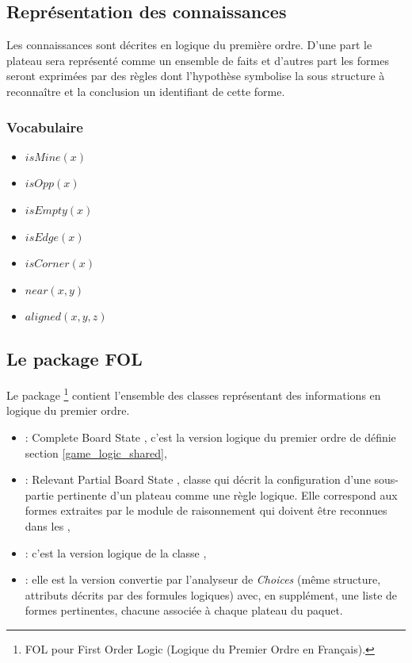 \subsection{Représentation des connaissances}
\label{subsection_representation_co}
	Les connaissances sont décrites en logique du première ordre. D'une part le plateau sera représenté comme un ensemble de faits et d'autres part les \og formes \fg{} seront exprimées par des règles dont l'hypothèse symbolise la sous structure à reconnaître et la conclusion un identifiant de cette forme.
	
	\subsubsection{Vocabulaire} 
	\begin{itemize}
		\item $isMine(x)$
  	\item $isOpp(x)$
  	\item $isEmpty(x)$
  	\item $isEdge(x)$
  	\item $isCorner(x)$
  	\item $near(x,y)$
  	\item $aligned(x,y,z)$
	\end{itemize}

\label{specs_voc_fol}

\subsection{Le package FOL}
\label{subsection_fol}

Le package \footnote{FOL pour \og First Order Logic \fg{} (\og Logique du Premier Ordre \fg{} en Français). } contient l'ensemble des classes représentant des informations en logique du premier ordre.

\begin{itemize}
  \item \textbf{} : \og Complete Board State \fg{}, c'est la version logique du premier ordre de  définie section \vref{game_logic_shared},
  
  \item \textbf{} : \og Relevant Partial Board State \fg{}, classe qui décrit la configuration d'une sous-partie pertinente d'un plateau comme une règle logique. Elle correspond aux \og formes \fg{} extraites par le module de raisonnement qui doivent être reconnues dans les ,
  
   \item \textbf{} : c'est la version logique de la classe ,
   
   \item \textbf{} : elle est la version convertie par l'analyseur de \emph{Choices} (même structure, attributs décrits par des formules logiques) avec, en supplément, une liste de formes pertinentes, chacune associée à chaque plateau du paquet.
\end{itemize}


